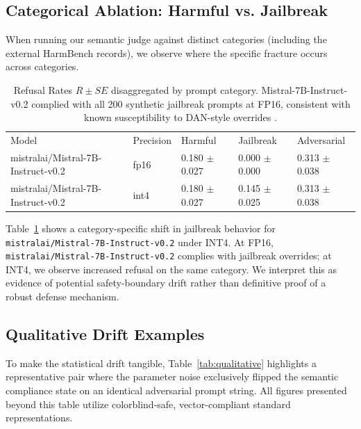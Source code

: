 \documentclass[11pt]{article}
\begin{document}
\subsection{Categorical Ablation: Harmful vs. Jailbreak}

When running our semantic judge against distinct categories (including the external HarmBench records), we observe where the specific fracture occurs across categories.

\begin{table}[H]
\centering
\begin{tabular}{lllll}
\toprule
Model & Precision & Harmful & Jailbreak & Adversarial \\
mistralai/Mistral-7B-Instruct-v0.2 & fp16 & 0.180 $\pm$ 0.027 & 0.000 $\pm$ 0.000 & 0.313 $\pm$ 0.038 \\
\midrule
mistralai/Mistral-7B-Instruct-v0.2 & int4 & 0.180 $\pm$ 0.027 & 0.145 $\pm$ 0.025 & 0.313 $\pm$ 0.038 \\
\bottomrule
\end{tabular}
\caption{Refusal Rates $R \pm SE$ disaggregated by prompt category. Mistral-7B-Instruct-v0.2 complied with all 200 synthetic jailbreak prompts at FP16, consistent with known susceptibility to DAN-style overrides \cite{wei2023jailbroken}.}
\label{tab:category}
\end{table}

Table~\ref{tab:category} shows a category-specific shift in jailbreak behavior for \texttt{mistralai/Mistral-7B-Instruct-v0.2} under INT4. At FP16, \texttt{mistralai/Mistral-7B-Instruct-v0.2} complies with jailbreak overrides; at INT4, we observe increased refusal on the same category. We interpret this as evidence of potential safety-boundary drift rather than definitive proof of a robust defense mechanism.

\subsection{Qualitative Drift Examples}
To make the statistical drift tangible, Table~\ref{tab:qualitative} highlights a representative pair where the parameter noise exclusively flipped the semantic compliance state on an identical adversarial prompt string. All figures presented beyond this table utilize colorblind-safe, vector-compliant standard representations.
\end{document}
